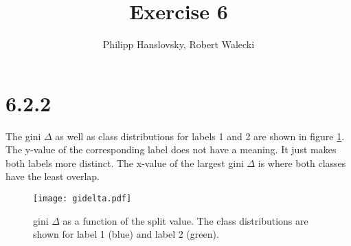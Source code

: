 \documentclass[a4paper,11pt]{article}
\title{Exercise 6}
\author{Philipp Hanslovsky, Robert Walecki}
\theoremstyle{definition}
\theoremstyle{plain}
\theoremstyle{remark}
\begin{document}


\maketitle

\section*{6.2.2}

The gini $\Delta$ as well as class distributions for labels 1 and 2 are shown in figure \ref{fig:gini}. The y-value of the corresponding label does not have a meaning. It just makes both labels more distinct. The x-value of the largest gini $\Delta$ is where both classes have the least overlap.

\begin{figure}[H]
\centering
\texttt{[image: gidelta.pdf]}
\caption{gini $\Delta$ as a function of the split value. The class distributions are shown for label 1 (blue) and label 2 (green).}
\label{fig:gini}
\end{figure}
\end{document}
